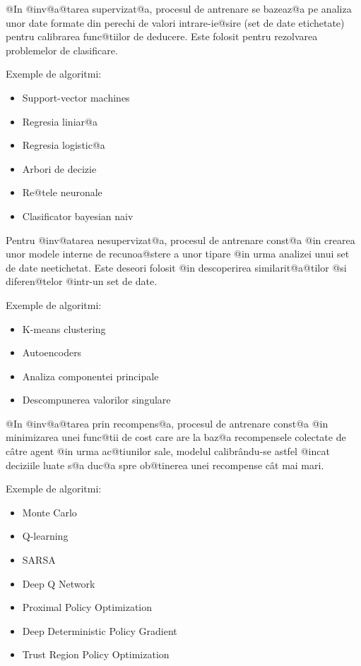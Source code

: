 \vspace{0.3cm}
@In @inv@a@tarea supervizat@a, procesul de antrenare se bazeaz@a pe analiza unor date formate din perechi de valori intrare-ie@sire (set de date etichetate) pentru calibrarea func@tiilor de deducere. Este folosit pentru rezolvarea problemelor de clasificare.

Exemple de algoritmi:
\begin{itemize}
	\item Support-vector machines
	\item Regresia liniar@a
	\item Regresia logistic@a
	\item Arbori de decizie
	\item Re@tele neuronale
	\item Clasificator bayesian naiv
\end{itemize}

Pentru @inv@atarea nesupervizat@a, procesul de antrenare const@a @in crearea unor modele interne de recunoa@stere a unor tipare @in urma analizei unui set de date neetichetat. Este deseori folosit @in descoperirea similarit@a@tilor @si diferen@telor @intr-un set de date.

Exemple de algoritmi:
\begin{itemize}
	\item K-means clustering
	\item Autoencoders
	\item Analiza componentei principale
	\item Descompunerea valorilor singulare
\end{itemize}

@In @inv@a@tarea prin recompens@a, procesul de antrenare const@a @in minimizarea unei func@tii de cost care are la baz@a recompensele colectate de c\^ atre agent @in urma ac@tiunilor sale, modelul calibr\^ andu-se astfel @incat deciziile luate s@a duc@a spre ob@tinerea unei recompense c\^ at mai mari.

Exemple de algoritmi:
\begin{itemize}
	\item Monte Carlo
	\item Q-learning
	\item SARSA
	\item Deep Q Network
	\item Proximal Policy Optimization
	\item Deep Deterministic Policy Gradient
	\item Trust Region Policy Optimization
\end{itemize}

